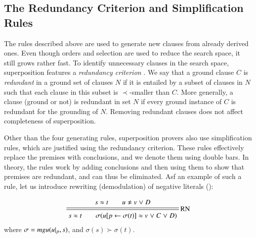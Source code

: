 

\medskip

\subsection{The Redundancy Criterion and Simplification Rules}

The rules described above are used to generate new clauses from already derived
ones. Even though orders and selection are used to reduce the search space,
it still grows rather fast. To identify unnecessary clauses in the search
space, superposition features a \emph{redundancy criterion}
\cite[Sect.~4.2.2]{bg-01-resolution}. We say that a ground clause $C$ is
{\em redundant} in a ground set of clauses $N$ if it is entailed by a subset of
clauses in $N$ such that each clause in this subset is $\prec$-smaller than $C$. More
generally, a clause (ground or not) is redundant in set $N$ if every ground
instance of $C$ is redundant for the grounding of $N$. Removing redundant
clauses does not affect completeness of superposition.

Other than the four generating rules, superposition provers also use
simplification rules, which are justified using the redundancy criterion. These
rules effectively replace the premises with conclusions, and we denote them
using double bars. In theory, the rules work by adding conclusions and then
using them to show that premises are redundant, and can thus be eliminated. Asf
an example of such a rule, let us introduce rewriting (demodulation) of negative
literals ():

\[
\namedsimp{RN}{s \eq t \qquad u \noteq v \llor D}
              {s \eq t \qquad \sigmacl{u[p \leftarrow \sigma(t)] \eq v \llor C \llor D}}
\]
where $\sigma = \mathit{mgu}(u|_p, s)$, and $\sigma(s) \succ \sigma(t)$.



